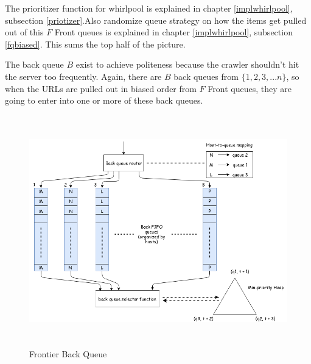 \noindent
The prioritizer function for whirlpool is explained in chapter \ref{implwhirlpool}, subsection \ref{priotizer}.Also randomize queue strategy on how the items get pulled out of this $F$ Front queues is explained in chapter \ref{implwhirlpool}, subsection \ref{fqbiased}. This sums the top half of the picture.

\pagebreak

\noindent
The back queue $B$ exist to achieve politeness because the crawler shouldn't hit the server too frequently.
Again, there are $B$ back queues from $\{1,2,3,...n\}$, so when the URLs are pulled out in biased order from $F$ Front queues, they are going to enter into one or more of these back queues. 

\begin{figure}[h!]
  \centering
  \includegraphics[width=13cm,height=10cm,keepaspectratio]{../media/crawler/b-queue.png}
  \caption{Frontier Back Queue}
  \label{fig:bqueue}
\end{figure}

